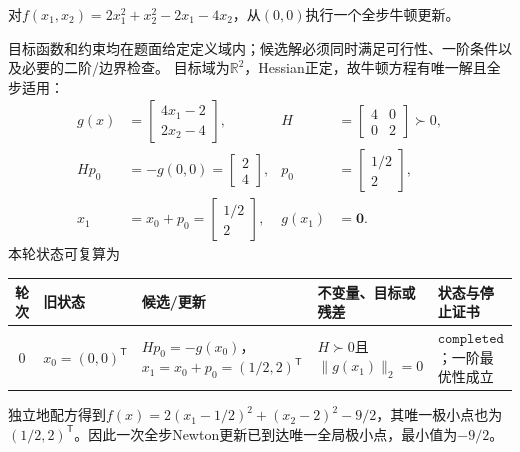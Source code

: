 \label{struct:V1-C08-CH20}
\begin{example}[正定二次函数的一步Newton更新]\label{exm:V1-C08-newton-quadratic}
对$f(x_1,x_2)=2x_1^2+x_2^2-2x_1-4x_2$，从$(0,0)$执行一个全步牛顿更新。
\end{example}
\begin{solution}
\SolGiven 目标函数和约束均在题面给定定义域内；候选解必须同时满足可行性、一阶条件以及必要的二阶/边界检查。
\SolDerive
目标域为$\mathbb R^2$，Hessian正定，故牛顿方程有唯一解且全步适用：
\[
\begin{aligned}
g(x)&=\begin{bmatrix}4x_1-2\\2x_2-4\end{bmatrix},
&H&=\begin{bmatrix}4&0\\0&2\end{bmatrix}\succ0,\\
H p_0&=-g(0,0)=\begin{bmatrix}2\\4\end{bmatrix},
&p_0&=\begin{bmatrix}1/2\\2\end{bmatrix},\\
x_1&=x_0+p_0=\begin{bmatrix}1/2\\2\end{bmatrix},
&g(x_1)&=\boldsymbol0.
\end{aligned}
\]
本轮状态可复算为
\begin{center}
\begin{tabularx}{\linewidth}{@{}c X X X X@{}}
\toprule
轮次 & 旧状态 & 候选/更新 & 不变量、目标或残差 & 状态与停止证书\\
\midrule
$0$ & $x_0=(0,0)^{\mathsf T}$ & $Hp_0=-g(x_0)$，$x_1=x_0+p_0=(1/2,2)^{\mathsf T}$ & $H\succ0$且$\|g(x_1)\|_2=0$ & $\mathtt{completed}$；一阶最优性成立\\
\bottomrule
\end{tabularx}
\end{center}
独立地配方得到$f(x)=2(x_1-1/2)^2+(x_2-2)^2-9/2$，其唯一极小点也为$(1/2,2)^{\mathsf T}$。因此一次全步Newton更新已到达唯一全局极小点，最小值为$-9/2$。
\end{solution}


